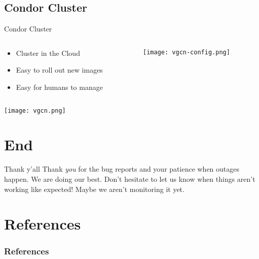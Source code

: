 \documentclass[12pt]{ufrslides}
\begin{document}
\subsection{Condor Cluster}
\begin{frame}{Condor Cluster}
	\begin{columns}[T] %
		\begin{column}{.48\textwidth}
			\begin{itemize}
				\item Cluster in the Cloud
				\item Easy to roll out new images
				\item Easy for humans to manage
			\end{itemize}
		\end{column}%
		\hfill%
		\begin{column}{.48\textwidth}
			\texttt{[image: vgcn-config.png]}
		\end{column}%
	\end{columns}

	\vfill
	\texttt{[image: vgcn.png]}
\end{frame}

\section{End}
\begin{frame}{Thank y'all}
Thank \emph{you} for the bug reports and your patience when outages happen.
\vfill
We are doing our best. Don't hesitate to let us know when things aren't working
like expected! Maybe we aren't monitoring it yet.
\vfill
\end{frame}

\section{References}
\begin{frame}[allowframebreaks]
	\frametitle{References}
	
	
\end{frame}
\end{document}
